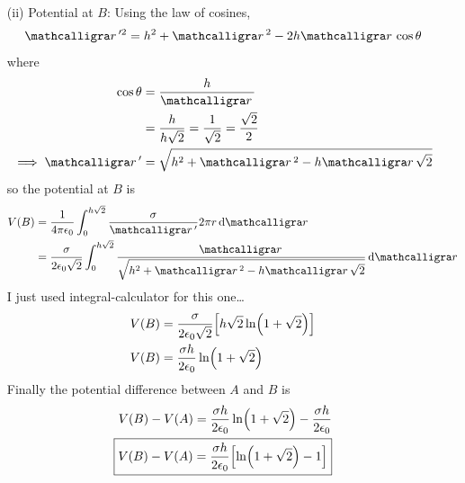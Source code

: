 \documentclass[../main.tex]{subfiles}
\begin{document}
\begin{itemize}
    \item[(ii)] Potential at $B$: Using the law of cosines,
    \begin{align*}
        \scriptr'^2 = h^2 + \scriptr^2 - 2h\scriptr\cos\theta
    \end{align*}
    where
    \begin{align*}
        \cos\theta &= \frac{h}{\scriptr} \\
        &= \frac{h}{h\sqrt{2}} = \frac{1}{\sqrt{2}} = \frac{\sqrt{2}}{2} \\
        \implies \scriptr' &= \sqrt{h^2 + \scriptr^2 - h\scriptr\sqrt{2}}
    \end{align*}
    so the potential at $B$ is
    \begin{align*}
        V(B) &= \ke \int_0^{h\sqrt{2}} \frac{\sigma}{\scriptr'} 2\pi r \dd{\scriptr} \\
        &= \frac{\sigma}{2\epsilon_0\sqrt{2}} \int_0^{h\sqrt{2}} \frac{\scriptr}{\sqrt{h^2 + \scriptr^2 - h\scriptr\sqrt{2}}} \dd{\scriptr}
    \end{align*}
    I just used integral-calculator for this one\dots
    \begin{align*}
        V(B) &= \frac{\sigma}{2\epsilon_0\sqrt{2}} \qt[h\sqrt{2} \ln(1 + \sqrt{2})] \\
        V(B) &= \frac{\sigma h}{2\epsilon_0} \ln(1 + \sqrt{2})
    \end{align*}
    Finally the potential difference between $A$ and $B$ is
    \begin{align*}
        V(B) - V(A) = \frac{\sigma h}{2\epsilon_0} \ln(1 + \sqrt{2}) - \frac{\sigma h}{2\epsilon_0} \\
        \boxed{V(B) - V(A) = \frac{\sigma h}{2\epsilon_0} \qt[\ln(1 + \sqrt{2}) - 1]}
    \end{align*}
\end{itemize}
\end{document}
